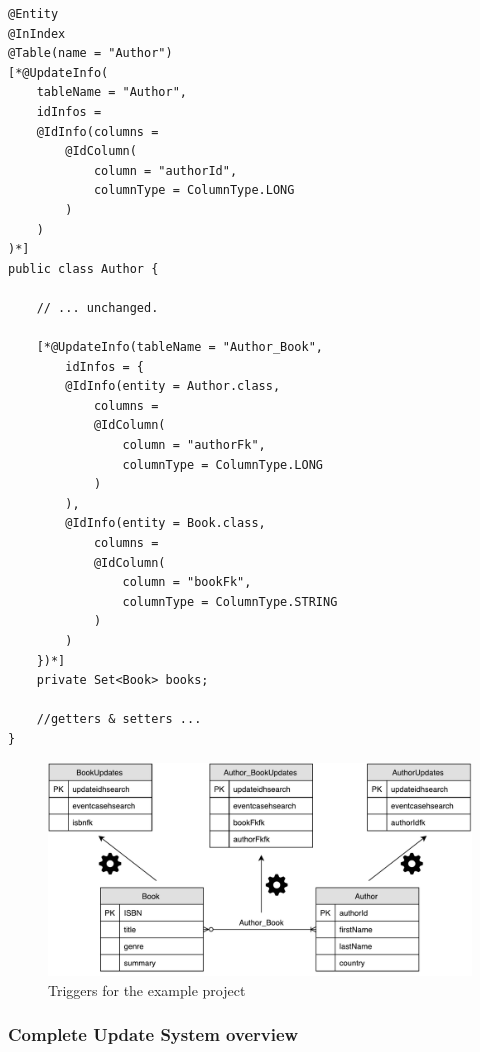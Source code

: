 \lstset{language=java}
\begin{lstlisting}[frame=htrbl, caption={Author.java with Hibernate Search annotations}, label={lst:author.java_3}]
@Entity
@InIndex
@Table(name = "Author")
[*@UpdateInfo(
	tableName = "Author", 
	idInfos = 
	@IdInfo(columns = 
		@IdColumn(
			column = "authorId", 
			columnType = ColumnType.LONG
		)
	)
)*]
public class Author {
	
	// ... unchanged.
	
	[*@UpdateInfo(tableName = "Author_Book", 
		idInfos = {
		@IdInfo(entity = Author.class, 
			columns = 
			@IdColumn(
				column = "authorFk",
				columnType = ColumnType.LONG
			)
		),
		@IdInfo(entity = Book.class,
			columns = 
			@IdColumn(
				column = "bookFk",
				columnType = ColumnType.STRING
			)
		)
	})*]
	private Set<Book> books;
	
	//getters & setters ...
}
\end{lstlisting}

\begin{figure}[ht]
	\centering
	\includegraphics[scale=0.6]{images/Triggers_Schema.pdf}
	\caption{Triggers for the example project}
	\label{triggers_schema}
\end{figure}

\subsubsection{Complete Update System overview}

